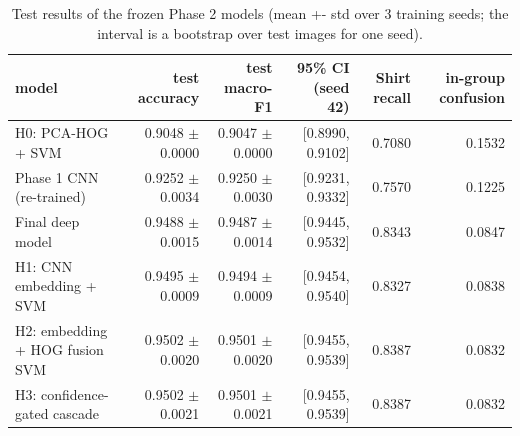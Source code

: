 \begin{table}[t]
\centering
\caption{Test results of the frozen Phase 2 models (mean +- std over 3 training seeds; the interval is a bootstrap over test images for one seed).}
\label{tab:p2_test}
\footnotesize
\begin{tabular}{lrrrrr}
\toprule
model & test accuracy & test macro-F1 & 95\% CI (seed 42) & Shirt recall & in-group confusion \\
\midrule
H0: PCA-HOG + SVM & 0.9048 $\pm$ 0.0000 & 0.9047 $\pm$ 0.0000 & [0.8990, 0.9102] & 0.7080 & 0.1532 \\
Phase 1 CNN (re-trained) & 0.9252 $\pm$ 0.0034 & 0.9250 $\pm$ 0.0030 & [0.9231, 0.9332] & 0.7570 & 0.1225 \\
Final deep model & 0.9488 $\pm$ 0.0015 & 0.9487 $\pm$ 0.0014 & [0.9445, 0.9532] & 0.8343 & 0.0847 \\
H1: CNN embedding + SVM & 0.9495 $\pm$ 0.0009 & 0.9494 $\pm$ 0.0009 & [0.9454, 0.9540] & 0.8327 & 0.0838 \\
H2: embedding + HOG fusion SVM & 0.9502 $\pm$ 0.0020 & 0.9501 $\pm$ 0.0020 & [0.9455, 0.9539] & 0.8387 & 0.0832 \\
H3: confidence-gated cascade & 0.9502 $\pm$ 0.0021 & 0.9501 $\pm$ 0.0021 & [0.9455, 0.9539] & 0.8387 & 0.0832 \\
\bottomrule
\end{tabular}
\end{table}
